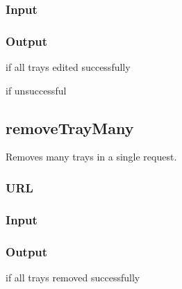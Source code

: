 \documentclass[letterpaper,10pt,english]{sphinxmanual}
\let\oldsubsection\subsection
\renewcommand{\subsection}{\needspace{6\baselineskip}\oldsubsection}
\begin{document}
\subsubsection{Input}
\label{\detokenize{docs/Developer/editTrayMany:input}}
\begin{sphinxVerbatim}[commandchars=\\\{\}]
       
\end{sphinxVerbatim}


\subsubsection{Output}
\label{\detokenize{docs/Developer/editTrayMany:output}}
 if all trays edited successfully

 if unsuccessful


\subsection{removeTrayMany}
\label{\detokenize{docs/Developer/removeTrayMany:removetraymany}}\label{\detokenize{docs/Developer/removeTrayMany::doc}}
Removes many trays in a single request.


\subsubsection{URL}
\label{\detokenize{docs/Developer/removeTrayMany:url}}


\subsubsection{Input}
\label{\detokenize{docs/Developer/removeTrayMany:input}}
\begin{sphinxVerbatim}[commandchars=\\\{\}]
       
\end{sphinxVerbatim}


\subsubsection{Output}
\label{\detokenize{docs/Developer/removeTrayMany:output}}
 if all trays removed successfully
\end{document}
